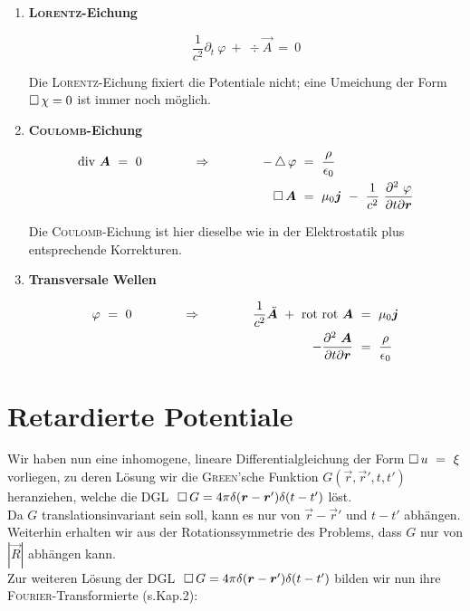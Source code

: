 \begin{enumerate}[label=\roman*)]
	
	\item \textbf{\textsc{Lorentz}-Eichung}
	
	\begin{equation*}
	\frac{1}{c^2} \partial_t \ \varphi \ + \ \div\vec{A} \ = \ 0
	\end{equation*}
	
	Die \textsc{Lorentz}-Eichung fixiert die Potentiale nicht; eine Umeichung der Form $\mathop{{}\Box}\nolimits\chi=0$ ist immer noch möglich.
	
	\item \textbf{\textsc{Coulomb}-Eichung}
	
	\begin{align*}
	\div\vec{A} \ = \ 0 \qquad\qquad \Rightarrow \qquad\qquad -\laplace\varphi \ &= \ \frac{\rho}{\epsilon_0}\\
	\Dalembert\vec{A} \ &= \ \mu_0\vec{j} \  - \ \frac{1}{c^2}\ \frac{\partial^2 \ \varphi}{\partial t \partial \vec{r}} 
	\end{align*}
	
	Die \textsc{Coulomb}-Eichung ist hier dieselbe wie in der Elektrostatik plus entsprechende Korrekturen.
	
	\item \textbf{Transversale Wellen}
	
	\begin{align*}
	\varphi \ = \ 0 \qquad\qquad\Rightarrow\qquad\qquad \frac{1}{c^2}\ddot{\vec{A}}\ + \ \rot\rot\vec{A} \ &= \ \mu_0\vec{j}\\
	- \frac{\partial^2 \ \vec{A}}{\partial t \partial \vec{r}}  \ &= \ \frac{\rho}{\epsilon_0} 
	\end{align*}
\end{enumerate}

\section{Retardierte Potentiale}

Wir haben nun eine inhomogene, lineare Differentialgleichung der Form $\mathop{{}\Box}\nolimits u \ = \ \xi$ vorliegen, zu deren Lösung wir die \textsc{Green}'sche Funktion $G(\vec{r},\vec{r}',t,t')$ heranziehen, welche die DGL $\;\mathop{{}\Box}\nolimits G = 4\pi \delta(\bm{r}-\bm{r}')\delta(t-t')$ löst.\\
Da $G$ translationsinvariant sein soll, kann es nur von $\vec{r}-\vec{r}'$ und $t-t'$ abhängen. Weiterhin erhalten wir aus der Rotationssymmetrie des Problems, dass $G$ nur von $|\vec{R}|$ abhängen kann.\\
Zur weiteren Lösung der DGL $\; \mathop{{}\Box}\nolimits G = 4\pi\delta(\bm{r}-\bm{r}')\delta(t-t')$ bilden wir nun ihre \textsc{Fourier}-Transformierte (s.Kap.2):

